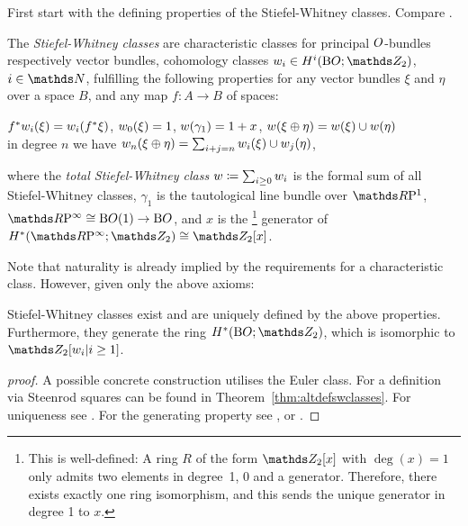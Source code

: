 First start with the defining properties of the Stiefel-Whitney
classes. Compare \forexample \cite[compare §4, p.~37]{milnor}.
\begin{Def}\label{def:swclasses}
  The \emph{Stiefel-Whitney classes} are
  characteristic classes for principal $O$-bundles
  respectively vector bundles,
  \idest cohomology classes
  $\ws{i}\in \H^i(\BO;\Zmod2)$, $i\in\Nat$,
  fulfilling the following properties for any vector bundles $\xi$ and
  $\eta$ over a space $B$, and any map $f\colon A\to B$ of spaces:
  \begin{axioms}
  \axiom[Naturality] ${f}^*{w_{i}}(\xi) = {w_{i}}({f}^* \xi)$,
  \axiom ${w_{0}}(\xi)=1$,
  \axiom ${w}(\gamma_1) = 1 + x$,
  \axiom[Multiplicativity]\label{tag:swclassesmultiplicativity}
  ${w}(\xi \oplus \eta) = {w}(\xi)\cup {w}(\eta)$
    \\\idest in degree $n$ we have
    ${w_{n}}(\xi\oplus\eta) = \sum_{i+j=n}{w_{i}}(\xi) \cup {w_{j}}(\eta)$,
  \end{axioms}
  where the \emph{total Stiefel-Whitney class}
  $w\coloneqq\sum_{i\geq 0}w_{i}$ is the formal sum of all
  Stiefel-Whitney classes,
  $\gamma_1$ is the tautological line bundle over $\RP 1$,
  $\RPinf\cong\BO(1)\to\BO$,
  and $x$ is the%
  \footnote{
    This is well-defined: A ring $R$ of the form $\Zmod2[x]$
    with $\deg(x)=1$ only admits two elements in degree~1, $0$ and a
    generator. Therefore, there exists exactly one ring
    isomorphism, and this sends the unique generator in
    degree 1 to $x$.
  }
  generator of $\H^*(\RPinf;\Zmod2)\cong\Zmod2[x]$.
\end{Def}
Note that naturality is already implied by the requirements for a
characteristic class. However, given only the above axioms:
\begin{Thm}
  Stiefel-Whitney classes exist and are uniquely defined by the above
  properties. Furthermore, they generate the ring
  $\H^*(\BO;\Zmod2)$, which is isomorphic to $\Zmod2[\ws{i}|i\geq1]$.
  \begin{proof}[proof]
      A possible concrete construction utilises the Euler
      class. For a definition via Steenrod squares can be 
      found in Theorem~\ref{thm:altdefswclasses}.
      For uniqueness see \cite[Uniqueness Theorem~7.3]{milnor}.
      For the generating property see \forexample
      \cite[Theorem~7.1~ff.]{milnor}, or \cite[Chap.~7.6]{may}.
  \end{proof}
\end{Thm}

